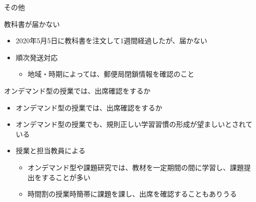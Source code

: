\documentclass[a4j,10pt]{jsarticle}
\def\lthtmlcheckvsize{\ifdim\ht\sizebox<\vsize 
  \ifdim\wd\sizebox<\hsize\expandafter\hfill\fi \expandafter\vfill
  \else\expandafter\vss\fi}%
\begin{document}
{\newpage\clearpage
{}%
\begin{frame}[label={sec:org8d64ca8},fragile]{その他}
\begin{block}{教科書が届かない}
\begin{itemize}
\item 2020年5月5日に教科書を注文して1週間経過したが、届かない
\item 順次発送対応
\begin{itemize}
\item 地域・時期によっては、郵便局閉鎖情報を確認のこと
\end{itemize}
\end{itemize}
\end{block}
\par
\begin{block}{オンデマンド型の授業では、出席確認をするか}
\begin{itemize}
\item オンデマンド型の授業では、出席確認をするか
\par
\item オンデマンド型の授業でも、規則正しい学習習慣の形成が望ましいとされている
\par
\item 授業と担当教員による
\begin{itemize}
\item オンデマンド型や課題研究では、教材を一定期間の間に学習し、課題提出をすることが多い
\item 時間割の授業時簡帯に課題を課し、出席を確認することもありうる
\end{itemize}
\end{itemize}
\end{block}
\end{frame}%
\lthtmlfigureZ
\lthtmlcheckvsize\clearpage}
\end{document}
